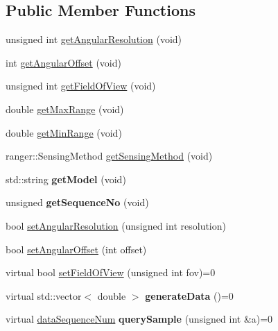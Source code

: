 \subsection*{Public Member Functions}
\begin{DoxyCompactItemize}
\item 
unsigned int \hyperlink{classRanger_a95b5013ae191d1e19b93fab002306718}{get\+Angular\+Resolution} (void)
\item 
int \hyperlink{classRanger_a1952b96d8dcbeb6afa107c8453d778a5}{get\+Angular\+Offset} (void)
\item 
unsigned int \hyperlink{classRanger_a4bca7dce56b7959257d90b1f30bf0271}{get\+Field\+Of\+View} (void)
\item 
double \hyperlink{classRanger_aba5e81260e55089d9ff869051156a722}{get\+Max\+Range} (void)
\item 
double \hyperlink{classRanger_a646a06d3916179b9ebc4502bad169eec}{get\+Min\+Range} (void)
\item 
ranger\+::\+Sensing\+Method \hyperlink{classRanger_a47e30b7ec55adec5bb542278ccfee140}{get\+Sensing\+Method} (void)
\item 
std\+::string {\bfseries get\+Model} (void)\hypertarget{classRanger_a00c1e787c323b1e1aa28333059fc4db5}{}\label{classRanger_a00c1e787c323b1e1aa28333059fc4db5}

\item 
unsigned {\bfseries get\+Sequence\+No} (void)\hypertarget{classRanger_a83af63e6556c2804b1869229a72246a5}{}\label{classRanger_a83af63e6556c2804b1869229a72246a5}

\item 
bool \hyperlink{classRanger_a3dc62dcba54eefbd7a0f08cbf97d87dc}{set\+Angular\+Resolution} (unsigned int resolution)
\item 
bool \hyperlink{classRanger_ae1b15546cf48d942f86ea1031e9be486}{set\+Angular\+Offset} (int offset)
\item 
virtual bool \hyperlink{classRanger_a9cebe84c1aec338dc0b72baff48ea9d4}{set\+Field\+Of\+View} (unsigned int fov)=0
\item 
virtual std\+::vector$<$ double $>$ {\bfseries generate\+Data} ()=0\hypertarget{classRanger_a1ac4a84f251b0793fc262643080f084a}{}\label{classRanger_a1ac4a84f251b0793fc262643080f084a}

\item 
virtual \hyperlink{structRanger_1_1dataSequenceNum}{data\+Sequence\+Num} {\bfseries query\+Sample} (unsigned int \&a)=0\hypertarget{classRanger_adbde91455d069a471c890e2aa808c0d3}{}\label{classRanger_adbde91455d069a471c890e2aa808c0d3}

\end{DoxyCompactItemize}
